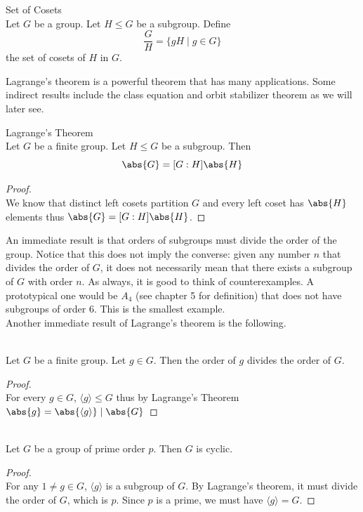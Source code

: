 \documentclass[a4paper]{article}
\begin{document}
\begin{defn}{Set of Cosets}{}\\
Let $G$ be a group. Let $H\leq G$ be a subgroup. Define $$\frac{G}{H}=\{gH\;|\;g\in G\}$$ the set of cosets of $H$ in $G$. 
\end{defn}

Lagrange's theorem is a powerful theorem that has many applications. Some indirect results include the class equation and orbit stabilizer theorem as we will later see. 

\begin{thm}{Lagrange's Theorem}{}\\
Let $G$ be a finite group. Let $H\leq G$ be a subgroup. Then $$\abs{G}=[G:H]\abs{H}$$ 
\begin{proof}\\
We know that distinct left cosets partition $G$ and every left coset has $\abs{H}$ elements thus $\abs{G}=[G:H]\abs{H}$. 
\end{proof}
\end{thm}

An immediate result is that orders of subgroups must divide the order of the group. Notice that this does not imply the converse: given any number $n$ that divides the order of $G$, it does not necessarily mean that there exists a subgroup of $G$ with order $n$. As always, it is good to think of counterexamples. A prototypical one would be $A_4$ (see chapter 5 for definition) that does not have subgroups of order $6$. This is the smallest example. \\

Another immediate result of Lagrange's theorem is the following. 

\begin{crl}{}{}\\
Let $G$ be a finite group. Let $g\in G$. Then the order of $g$ divides the order of $G$. 
\begin{proof}\\
For every $g\in G$, $\langle g\rangle\leq G$ thus by Lagrange's Theorem $\abs{g}=\abs{\langle g\rangle}\;|\;\abs{G}$
\end{proof}
\end{crl}

\begin{crl}{}{}\\
Let $G$ be a group of prime order $p$. Then $G$ is cyclic. 
\begin{proof}\\
For any $1\neq g\in G$, $\langle g\rangle$ is a subgroup of $G$. By Lagrange's theorem, it must divide the order of $G$, which is $p$. Since $p$ is a prime, we must have $\langle g\rangle=G$. 
\end{proof}
\end{crl}
\end{document}
